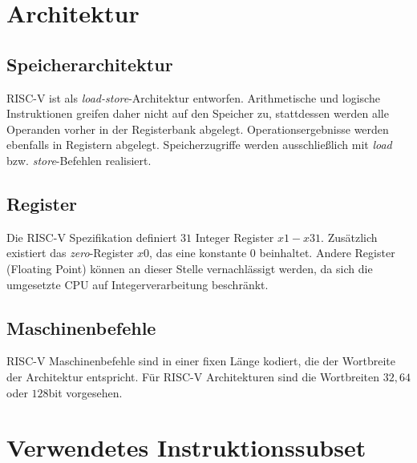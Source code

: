 

\section{Architektur}

\subsection{Speicherarchitektur}
RISC-V ist als \textit{load-store}-Architektur entworfen. Arithmetische und logische Instruktionen greifen daher nicht auf den Speicher zu, stattdessen werden alle Operanden vorher in der Registerbank abgelegt. Operationsergebnisse werden ebenfalls in Registern abgelegt. Speicherzugriffe werden ausschließlich mit \textit{load} bzw. \textit{store}-Befehlen realisiert.

\subsection{Register}
Die RISC-V Spezifikation definiert $31$ Integer Register $x1 - x31$. Zusätzlich existiert das \textit{zero}-Register $x0$, das eine konstante $0$ beinhaltet. Andere Register (Floating Point) können an dieser Stelle vernachlässigt werden, da sich die umgesetzte CPU auf Integerverarbeitung beschränkt.

\subsection{Maschinenbefehle}
RISC-V Maschinenbefehle sind in einer fixen Länge kodiert, die der Wortbreite der Architektur entspricht. Für RISC-V Architekturen sind die Wortbreiten $32, 64$ oder $128$bit vorgesehen.

\section{Verwendetes Instruktionssubset}

